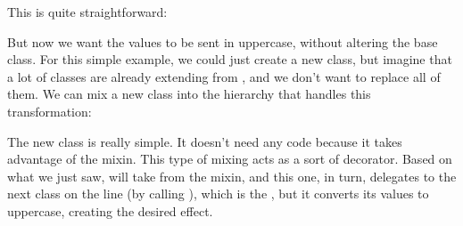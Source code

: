 \documentclass[a4paper,10pt,english]{sphinxmanual}
\begin{document}
This is quite straightforward:

\begin{sphinxVerbatim}[commandchars=\\\{\}]
  
\end{sphinxVerbatim}

But now we want the values to be sent in upper\sphinxhyphen{}case, without altering the base class. For this simple example,
we could just create a new class, but imagine that a lot of classes are already extending from
, and we don’t want to replace all of them. We can mix a new class into the hierarchy that
handles this transformation:

\begin{sphinxVerbatim}[commandchars=\\\{\}]
 
     
          

  
\end{sphinxVerbatim}

The new  class is really simple. It doesn’t need any code because it takes advantage of the mixin.
This type of mixing acts as a sort of decorator. Based on what we just saw,  will take 
from the mixin, and this one, in turn, delegates to the next class on the line (by calling ), which
is the , but it converts its values to uppercase, creating the desired effect.
\end{document}
